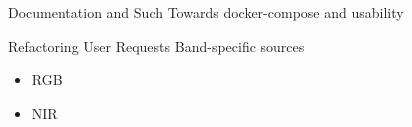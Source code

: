 




\begin{frame}{Documentation and Such}
    Towards docker-compose and usability
\end{frame}

\begin{frame}{Refactoring User Requests}
    Band-specific sources 
    \begin{itemize}
        \item RGB
        \item NIR
    \end{itemize}    
\end{frame}



